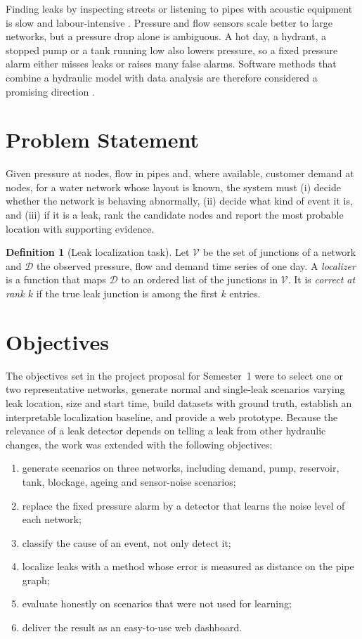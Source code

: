 \documentclass[11pt,letterpaper]{report}
\theoremstyle{definition}
\newtheorem{definition}[theorem]{Definition}
\theoremstyle{plain}
\theoremstyle{remark}
\begin{document}
Finding leaks by inspecting streets or listening to pipes with acoustic equipment is slow and labour-intensive \cite{vaquet2024survey}. Pressure and flow sensors scale better to large networks, but a pressure drop alone is ambiguous. A hot day, a hydrant, a stopped pump or a tank running low also lowers pressure, so a fixed pressure alarm either misses leaks or raises many false alarms. Software methods that combine a hydraulic model with data analysis are therefore considered a promising direction \cite{sousa2026review,romeroben2023review}.

\section{Problem Statement}
Given pressure at nodes, flow in pipes and, where available, customer demand at nodes, for a water network whose layout is known, the system must (i) decide whether the network is behaving abnormally, (ii) decide what kind of event it is, and (iii) if it is a leak, rank the candidate nodes and report the most probable location with supporting evidence.

\begin{definition}[Leak localization task]\label{def:task}
Let $\mathcal V$ be the set of junctions of a network and $\mathcal D$ the observed pressure, flow and demand time series of one day. A \emph{localizer} is a function that maps $\mathcal D$ to an ordered list of the junctions in $\mathcal V$. It is \emph{correct at rank $k$} if the true leak junction is among the first $k$ entries.
\end{definition}

\section{Objectives}
The objectives set in the project proposal for Semester~1 were to select one or two representative networks, generate normal and single-leak scenarios varying leak location, size and start time, build datasets with ground truth, establish an interpretable localization baseline, and provide a web prototype. Because the relevance of a leak detector depends on telling a leak from other hydraulic changes, the work was extended with the following objectives:
\begin{enumerate}
\item generate scenarios on three networks, including demand, pump, reservoir, tank, blockage, ageing and sensor-noise scenarios;
\item replace the fixed pressure alarm by a detector that learns the noise level of each network;
\item classify the cause of an event, not only detect it;
\item localize leaks with a method whose error is measured as distance on the pipe graph;
\item evaluate honestly on scenarios that were not used for learning;
\item deliver the result as an easy-to-use web dashboard.
\end{enumerate}
\end{document}
